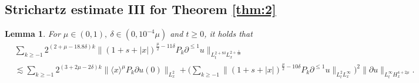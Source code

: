 \documentclass[11pt,twoside]{article}
\def\f{\frac}
\def\p{\partial}
\def\ls{\lesssim}
\newcommand{\w}[1]{\langle {#1} \rangle}
\theoremstyle{plain}
\newtheorem{lemma}[theorem]{Lemma}
\theoremstyle{definition}
\numberwithin{equation}{section}
\begin{document}
\subsection{Strichartz estimate III for Theorem \ref{thm:2}}
\begin{lemma}\label{lem:Estimate of Besov norm 4}
	For $\mu\in(0,1),\ \delta\in(0,10^{-4}\mu)$ and $t\ge0$, it holds that
	\begin{equation}\label{ineq:Estimate of Besov norm 4}
		\begin{split}
			&\sum_{k\ge -1}2^{(2 +\mu -18.8\delta) k}\|(1+s+|x|)^{\f{\mu}{2}-11\delta} P_{k}\p^{\le 1} u\|_{L_t^{2+8\delta}L^{2+\f{1}{2\delta}}_x}\\
			&\ls
			\sum_{k\ge -1}2^{(3+2\mu -2\delta) k}
			\|\w{x}^{\mu}P_k\partial u(0)\|_{L^2_x}
			+
			\big(\sum_{k\ge -1}\|(1+s+|x|)^{\f{\mu}{2}-10\delta}P_{k}\p^{\le 1} u\|_{L^2_tL^\infty_x}\big)^2
			\|\p u\|_{L^\infty_tH^{4+2\mu}_x}.
		\end{split}
	\end{equation}
\end{lemma}	
\end{document}
